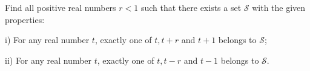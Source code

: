 Find all positive real numbers $r<1$ such that there exists a set $\mathcal{S}$ with the given properties:

i) For any real number $t$,  exactly one of $t, t+r$ and $t+1$ belongs to $\mathcal{S}$;

ii) For any real number $t$,  exactly one of $t, t-r$ and $t-1$ belongs to $\mathcal{S}$.